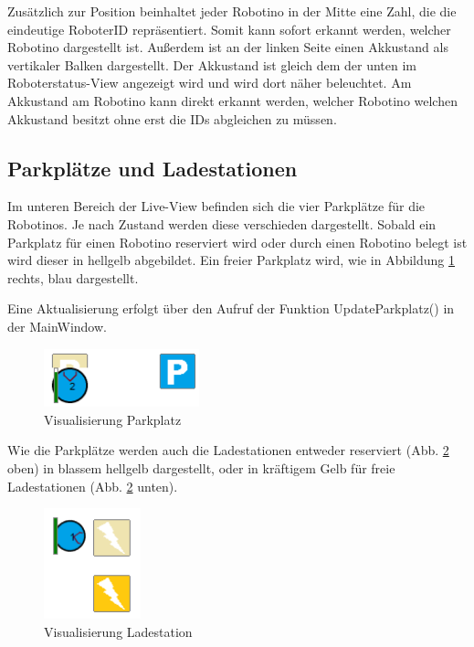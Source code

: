 Zusätzlich zur Position beinhaltet jeder Robotino in der Mitte eine Zahl, die die eindeutige RoboterID repräsentiert. Somit kann sofort erkannt werden, welcher Robotino dargestellt ist. Außerdem ist an der linken Seite einen Akkustand als vertikaler Balken dargestellt. Der Akkustand ist gleich dem der unten im Roboterstatus-View angezeigt wird und wird dort näher beleuchtet. Am Akkustand am Robotino kann direkt erkannt werden, welcher Robotino welchen Akkustand besitzt ohne erst die IDs abgleichen zu müssen.  

\subsection{Parkplätze und Ladestationen}

Im unteren Bereich der Live-View befinden sich die vier Parkplätze für die Robotinos. Je nach Zustand werden diese verschieden dargestellt. Sobald ein Parkplatz für einen Robotino reserviert wird oder durch einen Robotino belegt ist wird dieser in hellgelb abgebildet. 
Ein freier Parkplatz wird, wie in Abbildung \ref{fig:Parkplatz} rechts, blau dargestellt. 

Eine Aktualisierung erfolgt über den Aufruf der Funktion UpdateParkplatz() in der MainWindow. 

\begin{figure}[htb]
    \centering
    \includegraphics[width=0.4\textwidth]{Abbildungen/Parkplatz.png}
    \caption{Visualisierung Parkplatz}		
    \label{fig:Parkplatz}
\end{figure}

Wie die Parkplätze werden auch die Ladestationen entweder reserviert (Abb. \ref{fig:Ladestation} oben) in blassem hellgelb dargestellt, oder in kräftigem Gelb für freie Ladestationen (Abb. \ref{fig:Ladestation} unten). 

\begin{figure}[htb]
    \centering
    \includegraphics[width=0.25\textwidth]{Abbildungen/Laden.png}
    \caption{Visualisierung Ladestation}		
    \label{fig:Ladestation}
\end{figure}

